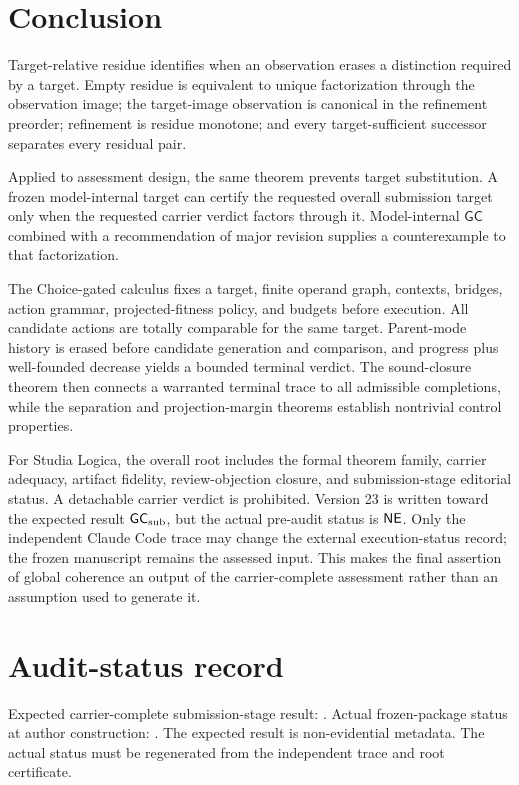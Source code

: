 \documentclass[10pt]{article}
\newcommand{\GC}{\mathsf{GC}}
\begin{document}
\section{Conclusion}

Target-relative residue identifies when an observation erases a distinction required by a target.  Empty residue is equivalent to unique factorization through the observation image; the target-image observation is canonical in the refinement preorder; refinement is residue monotone; and every target-sufficient successor separates every residual pair.

Applied to assessment design, the same theorem prevents target substitution.  A frozen model-internal target can certify the requested overall submission target only when the requested carrier verdict factors through it.  Model-internal $\GC$ combined with a recommendation of major revision supplies a counterexample to that factorization.

The Choice-gated calculus fixes a target, finite operand graph, contexts, bridges, action grammar, projected-fitness policy, and budgets before execution.  All candidate actions are totally comparable for the same target.  Parent-mode history is erased before candidate generation and comparison, and progress plus well-founded decrease yields a bounded terminal verdict.  The sound-closure theorem then connects a warranted terminal trace to all admissible completions, while the separation and projection-margin theorems establish nontrivial control properties.

For Studia Logica, the overall root includes the formal theorem family, carrier adequacy, artifact fidelity, review-objection closure, and submission-stage editorial status.  A detachable carrier verdict is prohibited.  Version 23 is written toward the expected result $\mathsf{GC}_{\mathrm{sub}}$, but the actual pre-audit status is $\mathsf{NE}$.  Only the independent Claude Code trace may change the external execution-status record; the frozen manuscript remains the assessed input.  This makes the final assertion of global coherence an output of the carrier-complete assessment rather than an assumption used to generate it.

\section*{Audit-status record}
Expected carrier-complete submission-stage result: \ExpectedOverallGCA.  Actual frozen-package status at author construction: \ActualOverallGCA.  The expected result is non-evidential metadata.  The actual status must be regenerated from the independent trace and root certificate.
\end{document}
